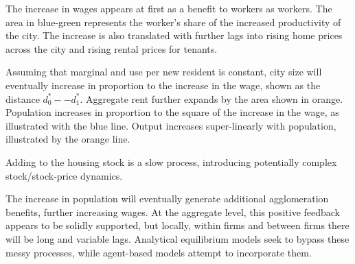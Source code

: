 The increase in wages appears at first as a benefit to workers as workers. The area in blue-green represents the worker's share of the increased productivity of the city. The increase is also translated with further lags into rising home prices across the city and rising rental prices for tenants. 


\begin{center}
\end{center}

Assuming that marginal and use per new resident is constant, city size will eventually increase in proportion to the increase in the wage, shown as the distance $d^*_0--d^*_1$. Aggregate rent  further expands by the area shown in orange. Population increases in proportion to the square of the increase in the wage, as illustrated with the blue line.  Output increases super-linearly with population, illustrated by the orange line. 

Adding to the  housing stock is a slow process, introducing potentially complex stock/stock-price dynamics.

The increase in population will eventually generate additional agglomeration benefits, further increasing wages. At the aggregate level, this positive feedback appears to be solidly supported, but locally, within firms and between firms there will be long and variable lags. Analytical equilibrium models seek to bypass these messy processes, while agent-based models attempt to incorporate them.



